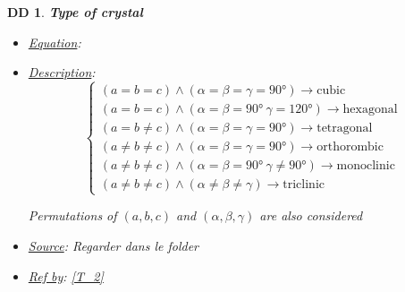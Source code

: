 \documentclass[12pt]{article}
\newtheorem{DD}{DD}
\begin{document}
\begin{DD}
\label{DD_3}
\noindent\colorbox{shadecolorDD}{\normalfont \textbf{Type of crystal}}
\normalfont
\begin{itemize}
\item \underline{Equation}:  
\item \underline{Description}: 
\begin{equation}
\begin{cases}
(a=b=c) \wedge (\alpha=\beta=\gamma = \ang{90}) \rightarrow \text{cubic}\\
(a=b=c) \wedge (\alpha=\beta=\ang{90} \ \gamma = \ang{120}) \rightarrow \text{hexagonal} \\
(a=b\neq c) \wedge (\alpha=\beta=\gamma = \ang{90}) \rightarrow \text{tetragonal}\\
(a\neq b\neq c) \wedge (\alpha=\beta=\gamma = \ang{90}) \rightarrow \text{orthorombic}\\
(a\neq b\neq c) \wedge (\alpha=\beta=\ang{90} \ \gamma \neq \ang{90}) \rightarrow \text{monoclinic}\\
(a\neq b\neq c) \wedge (\alpha\neq\beta\neq\gamma)  \rightarrow \text{triclinic}
\end{cases}
\label{eq:crystal_type}
\end{equation}

Permutations of $(a,b,c)$ and $(\alpha, \beta, \gamma)$ are also considered 
\item \underline{Source}: Regarder dans le folder
\item \underline{Ref by}: \cref{T_2}
\end{itemize}
\end{DD}
\end{document}
